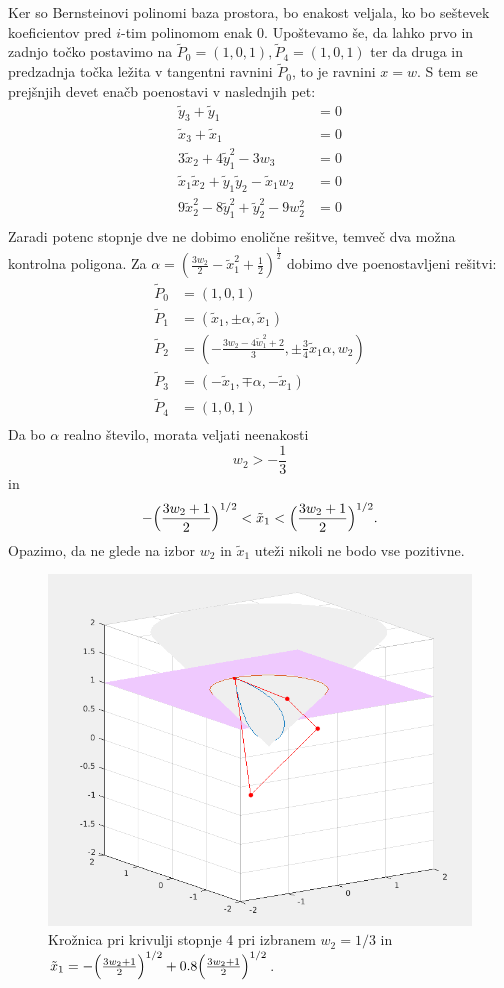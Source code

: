 \documentclass[a4paper,12pt]{article}
\begin{document}
Ker so Bernsteinovi polinomi baza prostora, bo enakost veljala, ko bo seštevek koeficientov pred $i$-tim polinomom enak 0. Upoštevamo še, da lahko prvo in zadnjo točko postavimo na $\tilde{P}_0 = (1,0, 1), \tilde{P}_4 = (1,0, 1)$ ter da druga in predzadnja točka ležita v tangentni ravnini $\tilde{P}_0$, to je ravnini $x = w$. S tem se prejšnjih devet enačb poenostavi v naslednjih pet:
\begin{align*}
\tilde{y}_3 + \tilde{y}_1 &= 0\\
\tilde{x}_3 + \tilde{x}_1 &= 0\\
3\tilde{x}_2 + 4\tilde{y}_1^2 - 3w_3 &= 0 \\
\tilde{x}_1\tilde{x}_2 + \tilde{y}_1\tilde{y}_2  - \tilde{x}_1w_2 &= 0 \\
9\tilde{x}_2^2 - 8\tilde{y}_1^2 + \tilde{y}_2^2 - 9w_2^2&= 0 \\
\end{align*}
Zaradi potenc stopnje dve ne dobimo enolične rešitve, temveč dva možna kontrolna poligona. Za $\alpha = (\frac{3w_2}{2} - \tilde{x}_1^2 + \frac{1}{2})^{\frac{1}{2}}$ dobimo dve poenostavljeni rešitvi:
\begin{align*}
\tilde{P}_0 &= (1,0, 1)\\
\tilde{P}_1 &= (\tilde{x}_1, \pm \alpha,\tilde{x}_1)\\
\tilde{P}_2 &= (-\frac{3w_2 - 4\tilde{w}_1^2+2}{3}, \pm \frac{3}{4}\tilde{x}_1\alpha, w_2)\\
\tilde{P}_3 &= (-\tilde{x}_1, \mp \alpha,-\tilde{x}_1)\\
\tilde{P}_4 &= (1,0,1) \\
\end{align*}
Da bo $\alpha$ realno število, morata veljati neenakosti $$w_2 > -\frac{1}{3}$$ in $$-\Big{(}\frac{3w_2+1}{2}\Big{)}^{1/2} < \tilde{x}_1 < \Big{(}\frac{3w_2+1}{2}\Big{)}^{1/2}.$$
Opazimo, da ne glede na izbor $w_2$ in $\tilde{x}_1$ uteži nikoli ne bodo vse pozitivne.
\begin{figure}[h!]
\includegraphics[scale=0.35]{kvarticna.png}
\centering
\caption{Krožnica pri krivulji stopnje 4 pri izbranem $w_2 = 1/3$ in $\tilde{x}_1 = -\Big{(}\frac{3w_2+1}{2}\Big{)}^{1/2} + 0.8 \Big{(}\frac{3w_2+1}{2}\Big{)}^{1/2}$.}
\end{figure}
\end{document}
